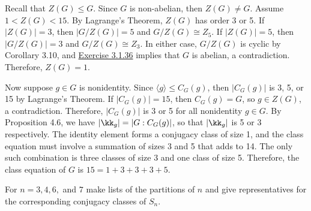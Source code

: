 \begin{sol}
	Recall that $Z(G) \leq G$. Since $G$ is non-abelian, then $Z(G) \neq G$. Assume $1 < Z(G) < 15$. By Lagrange's Theorem, $Z(G)$ has order 3 or 5. If $|Z(G)| = 3$, then $|G/Z(G)| = 5$ and $G/Z(G) \cong Z_5$. If $|Z(G)| = 5$, then $|G/Z(G)| = 3$ and $G/Z(G) \cong Z_3$. In either case, $G/Z(G)$ is cyclic by Corollary 3.10, and \hyperref[ex3.1.36]{Exercise 3.1.36} implies that $G$ is abelian, a contradiction. Therefore, $Z(G) = 1$.

	Now suppose $g \in G$ is nonidentity. Since $\langle g \rangle \leq C_G(g)$, then $|C_G(g)|$ is 3, 5, or 15 by Lagrange's Theorem. If $|C_G(g)| = 15$, then $C_G(g) = G$, so $g \in Z(G)$, a contradiction. Therefore, $|C_G(g)|$ is 3 or 5 for all nonidentity $g \in G$. By Proposition 4.6, we have $|\kk_g| = |G : C_G(g)|$, so that $|\kk_g|$ is 5 or 3 respectively. The identity element forms a conjugacy class of size 1, and the class equation must involve a summation of sizes 3 and 5 that adds to 14. The only such combination is three classes of size 3 and one class of size 5. Therefore, the class equation of $G$ is $15 = 1 + 3 + 3 + 3 + 5$.
\end{sol}

\begin{exercise}
	For $n=3,4,6,$ and $7$ make lists of the partitions of $n$ and give representatives for the corresponding conjugacy classes of $S_n$.
\end{exercise}

